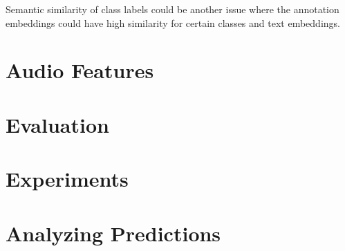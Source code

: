 \documentclass{article}
\begin{document}
Semantic similarity of class labels could be another issue where the annotation embeddings could have high similarity for certain classes and text embeddings. 



\section{Audio Features}


\section{Evaluation}


\section{Experiments}


\section{Analyzing Predictions}
\end{document}
